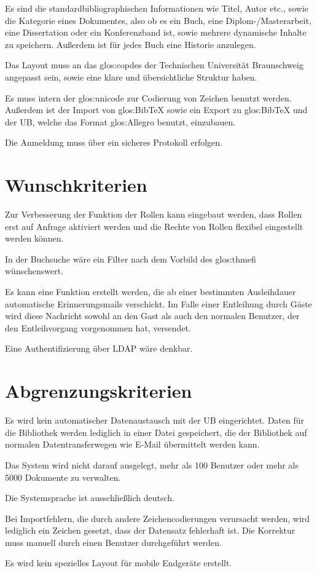 Es sind die standardbibliographischen Informationen wie Titel, Autor etc., sowie die Kategorie eines Dokumentes, also ob es ein Buch, eine Diplom-/Masterarbeit, eine Dissertation oder ein Konferenzband ist, sowie mehrere dynamische Inhalte zu speichern. Außerdem ist für jedes Buch eine Historie anzulegen. 

Das Layout muss an das \gls{glos:copdes} der Technischen Universität Braunschweig angepasst sein, sowie eine klare und übersichtliche Struktur haben. 

Es muss intern der \gls{glos:unicode} zur Codierung von Zeichen benutzt werden. Außerdem ist der Import von \gls{glos:BibTeX} sowie ein Export zu \gls{glos:BibTeX} und der \gls{UB}, welche das Format \gls{glos:Allegro} benutzt, einzubauen. 

Die Anmeldung muss über ein sicheres Protokoll erfolgen.

\section{Wunschkriterien}
Zur Verbesserung der Funktion der Rollen kann eingebaut werden, dass Rollen erst auf Anfrage aktiviert werden und die Rechte von Rollen flexibel eingestellt werden können. 

In der Buchsuche wäre ein Filter nach dem Vorbild des \gls{glos:thmefi} wünschenswert. 

Es kann eine Funktion erstellt werden, die ab einer bestimmten Ausleihdauer automatische Erinnerungsmails verschickt. Im Falle einer Entleihung durch Gäste wird diese Nachricht sowohl an den Gast als auch den normalen Benutzer, der den Entleihvorgang vorgenommen hat, versendet. 

Eine Authentifizierung über \gls{LDAP} wäre denkbar.

\section{Abgrenzungskriterien}
Es wird kein automatischer Datenaustausch mit der \gls{UB} eingerichtet. Daten für die Bibliothek werden lediglich in einer Datei gespeichert, die der Bibliothek auf normalen Datentransferwegen wie E-Mail übermittelt werden kann. 

Das System wird nicht darauf ausgelegt, mehr als 100 Benutzer oder mehr als 5000 Dokumente zu verwalten.

Die Systemsprache ist ausschließlich deutsch.

Bei Importfehlern, die durch andere Zeichencodierungen verursacht werden, wird lediglich ein Zeichen gesetzt, dass der Datensatz fehlerhaft ist. Die Korrektur muss manuell durch einen Benutzer durchgeführt werden.

Es wird kein spezielles Layout für mobile Endgeräte erstellt.
